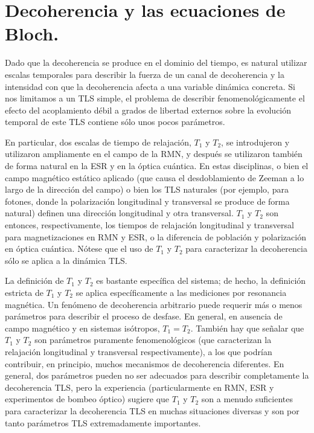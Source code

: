 \documentclass[a4paper,11pt]{book} %
\numberwithin{equation}{chapter}
\begin{document}
	\section{Decoherencia y las ecuaciones de Bloch.}
	
Dado que la decoherencia se produce en el dominio del tiempo, es natural utilizar escalas temporales para describir la fuerza de un canal de decoherencia y la intensidad con que la decoherencia afecta a una variable dinámica concreta. Si nos limitamos a un TLS simple, el problema de describir fenomenológicamente el efecto del acoplamiento débil a grados de libertad externos sobre la evolución temporal de este TLS contiene sólo unos pocos parámetros. 

En particular, dos escalas de tiempo de relajación, $T_1$ y $T_2$, se introdujeron y utilizaron ampliamente en el campo de la RMN, y después se utilizaron también de forma natural en la ESR y en la óptica cuántica. En estas disciplinas, o bien el campo magnético estático aplicado (que causa el desdoblamiento de Zeeman a lo largo de la dirección del campo) o bien los TLS naturales (por ejemplo, para fotones, donde la polarización longitudinal y transversal se produce de forma natural) definen una dirección longitudinal y otra transversal. $T_1$ y $T_2$ son entonces, respectivamente, los tiempos de relajación longitudinal y transversal para magnetizaciones en RMN y ESR, o la diferencia de población y polarización en óptica cuántica. Nótese que el uso de $T_1$ y $T_2$ para caracterizar la decoherencia sólo se aplica a la dinámica TLS.

La definición de $T_1$ y $T_2$ es bastante específica del sistema; de hecho, la definición estricta de $T_1$ y $T_2$ se aplica específicamente a las mediciones por resonancia magnética. Un fenómeno de decoherencia arbitrario puede requerir más o menos parámetros para describir el proceso de desfase. En general, en ausencia de campo magnético y en sistemas isótropos, $T_1 = T_2$. También hay que señalar que $T_1$ y $T_2$ son parámetros puramente fenomenológicos (que caracterizan la relajación longitudinal y transversal respectivamente), a los que podrían contribuir, en principio, muchos mecanismos de decoherencia diferentes. En general, dos parámetros pueden no ser adecuados para describir completamente la decoherencia TLS, pero la experiencia (particularmente en RMN, ESR y experimentos de bombeo óptico) sugiere que $T_1$ y $T_2$ son a menudo suficientes para caracterizar la decoherencia TLS en muchas situaciones diversas y son por tanto parámetros TLS extremadamente importantes.
\end{document}

